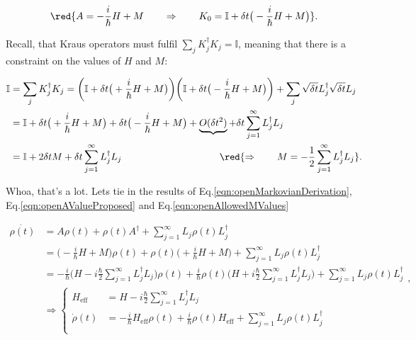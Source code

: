 \begin{equation}
  \red{A = -\frac{i}{\hbar}H+M \qquad \Rightarrow \qquad K_0 = \mathbb{I} + \delta t\big(-\frac{i}{\hbar}H+M\big)}.
  \label{eqn:openAValueProposed}
\end{equation}

\noindent     Recall,    that     Kraus    operators     must    fulfil
$\sum_jK_j^\dagger K_j=\mathbb{I}$, meaning that  there is a constraint
on the values of $H$ and $M$:

\begin{equation}
  \begin{aligned}
    \mathbb{I} & = \sum_jK_j^\dagger K_j = \bigg(\mathbb{I} + \delta t\big(+\frac{i}{\hbar}H+M\big)\bigg)\bigg(\mathbb{I} + \delta t\big(-\frac{i}{\hbar}H+M\big)\bigg) + \sum_j\sqrt{\delta t}L_j^\dagger\sqrt{\delta t}L_j\\
    & = \mathbb{I} + \delta t\big(+\frac{i}{\hbar}H+M\big) + \delta t\big(-\frac{i}{\hbar}H+M\big) + \underbrace{O(\delta t^2)} + \delta t\sum_{j=1}^{\infty}L_j^\dagger L_j\\
    &     =      \mathbb{I}     +      2\delta     tM      +     \delta
    t\sum_{j=1}^{\infty}L_j^\dagger  L_j  \qquad \qquad  \qquad  \qquad
    \qquad         \red{\Rightarrow          \qquad         M         =
      -\frac{1}{2}\sum_{j=1}^{\infty}L_j^\dagger L_j}.
  \end{aligned}
  \label{eqn:openAllowedMValues}
\end{equation}

\noindent   Whoa,  that's   a  lot.   Lets  tie   in  the   results  of
Eq.\eqref{eqn:openMarkovianDerivation},
Eq.\eqref{eqn:openAValueProposed} and Eq.\eqref{eqn:openAllowedMValues}

\begin{equation}
  \begin{aligned}
    \dot{\rho(t)} & = A\rho(t) + \rho(t)A^\dagger + \sum_{j=1}^\infty L_j\rho(t)L_j^\dagger\\
    & = \bigg(-\frac{i}{\hbar}H +M\bigg)\rho(t) + \rho(t)\bigg(+\frac{i}{\hbar}H + M\bigg) + \sum_{j=1}^\infty L_j\rho(t)L_j^\dagger\\
    & = -\frac{i}{\hbar}\bigg(H -i\frac{\hbar}{2}\sum_{j=1}^{\infty}L_j^\dagger L_j\bigg)\rho(t) + \frac{i}{\hbar} \rho(t)\bigg(H +i\frac{\hbar}{2}\sum_{j=1}^{\infty}L_j^\dagger L_j\bigg) + \sum_{j=1}^\infty L_j\rho(t)L_j^\dagger\\
    & \Rightarrow \left\lbrace
      \begin{aligned}
        H_\text{eff} & = H - i\frac{\hbar}{2}\sum_{j=1}^{\infty}L_j^\dagger L_j\\
        \dot{\rho}(t) & = -\frac{i}{\hbar}H_\text{eff}\rho(t) + \frac{i}{\hbar} \rho(t)H_\text{eff} + \sum_{j=1}^\infty L_j\rho(t)L_j^\dagger\\
      \end{aligned}
    \right.
  \end{aligned},
\end{equation}

